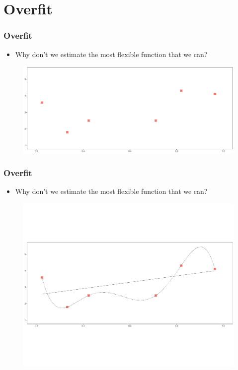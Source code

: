 \documentclass[
  shownotes,
  xcolor={svgnames},
  hyperref={colorlinks,citecolor=DarkBlue,linkcolor=DarkRed,urlcolor=DarkBlue}
  , aspectratio=169]{beamer}
\begin{document}
\section{Overfit}
\begin{frame}[fragile]
\frametitle{Overfit}

\begin{itemize} 
  \item Why don’t we estimate the most flexible function that we can?
\end{itemize}
        \begin{figure}[H] \centering
            \captionsetup{justification=centering}
              \includegraphics[scale=0.4]{figures/fig_1a.pdf}
 \end{figure}


\end{frame}
\begin{frame}[fragile]
\frametitle{Overfit}

\begin{itemize} 
  \item Why don’t we estimate the most flexible function that we can?
\end{itemize}
        \begin{figure}[H] \centering
            \captionsetup{justification=centering}
              \includegraphics[scale=0.4]{figures/fig_1h_0.pdf}
 \end{figure}


\end{frame}
\end{document}
